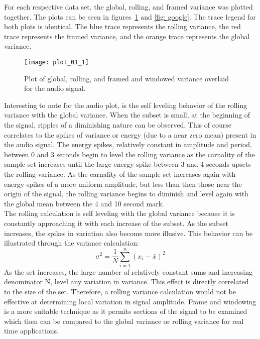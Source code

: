 For each respective data set, the global, rolling, and framed variance was plotted together. The plots can be seen in figures~\ref{fig: audio} and \ref{fig: google}. The trace legend for both plots is identical. The blue trace represents the rolling variance, the red trace represents the framed variance, and the orange trace represents the global variance. 

\begin{figure}[H] 
	\centering 
	\texttt{[image: plot\_01\_1]}
	\caption{Plot of global, rolling, and framed and windowed variance overlaid for the audio signal.}
	\label{fig: audio} 
\end{figure}


Interesting to note for the audio plot, is the self leveling behavior of the rolling variance  with the global variance. When the subset is small, at the beginning of the signal, ripples of a diminishing nature can be observed. This of course correlates to the spikes of variance or energy (due to a near zero mean) present in the audio signal. The energy spikes, relatively constant in amplitude and period, between 0 and 3 seconds begin to level the rolling variance as the carnality of the sample set increases until the large energy spike between 3 and 4 seconds upsets the rolling variance. As the carnality of the sample set increases again with  energy spikes of a more uniform amplitude, but less than then those near the origin of the signal, the rolling variance begins to diminish and level again with the global mean between the 4 and 10 second mark. \\

The rolling calculation is self leveling with the global variance because it is constantly approaching it with each increase of the subset. As the subset increases, the spikes in variation also become more illusive. This behavior can be illustrated through the variance calculation: 
\begin{equation}
\sigma^2 = \frac{1}{N}\sum_{i=1}^{n}(x_i - \bar{x})^2
\end{equation}
As the set increases, the large number of relatively constant sums and increasing denominator N, level any variation in variance. This effect is directly correlated to the size of the set. Therefore, a rolling variance calculation would not be effective at determining local variation in signal amplitude. Frame and windowing is a more suitable technique as it permits sections of the signal to be examined which then can be compared to the global variance or rolling variance for real time applications.  

